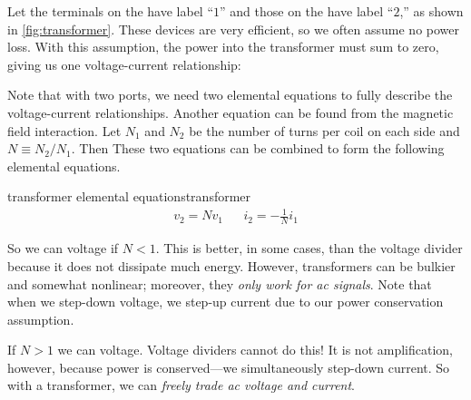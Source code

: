 \documentclass[electronics.tex]{subfiles}
\begin{document}
Let the terminals on the  have label ``$1$'' and those on the  have label ``$2$,'' as shown in \autoref{fig:transformer}. These devices are very efficient, so we often assume no power loss.
With this assumption, the power into the transformer must sum to zero, giving us one voltage-current relationship:

Note that with two ports, we need two elemental equations to fully describe the voltage-current relationships.
Another equation can be found from the magnetic field interaction.
Let $N_1$ and $N_2$ be the number of turns per coil on each side and $N \equiv N_2/N_1$.
Then
These two equations can be combined to form the following elemental equations.
\begin{Definition}{transformer elemental equations}{transformer}
	\begin{align*}
		v_2 = N v_1 && i_2 = -\frac{1}{N} i_1
	\end{align*}
\end{Definition}

So we can  voltage if $N<1$.
This is better, in some cases, than the voltage divider because it does not dissipate much energy.
However, transformers can be bulkier and somewhat nonlinear; moreover, they \emph{only work for ac signals}.
Note that when we step-down voltage, we step-up current due to our power conservation assumption.

If $N>1$ we can  voltage.
Voltage dividers cannot do this!
It is not amplification, however, because power is conserved---we simultaneously step-down current.
So with a transformer, we can \emph{freely trade ac voltage and current}.
\end{document}
